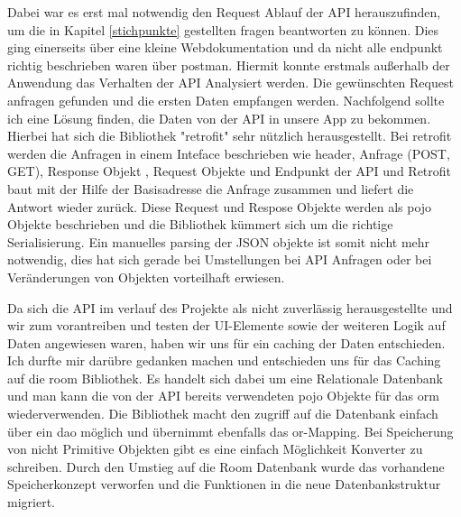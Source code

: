 Dabei war es erst mal notwendig den Request Ablauf der API herauszufinden, um die in Kapitel \ref{stichpunkte} gestellten fragen beantworten zu können. Dies ging einerseits über eine kleine Webdokumentation und da nicht alle endpunkt richtig beschrieben waren über \gls{postman}. Hiermit konnte erstmals außerhalb der Anwendung das Verhalten der API Analysiert werden. Die gewünschten Request anfragen gefunden und die ersten Daten empfangen werden. Nachfolgend sollte ich eine Lösung finden, die Daten von der API in unsere App zu bekommen. Hierbei hat sich die Bibliothek "\gls{retrofit}" sehr nützlich herausgestellt. Bei \gls{retrofit} werden die Anfragen in einem Inteface beschrieben wie header, Anfrage (POST, GET), Response Objekt , Request Objekte und Endpunkt der API und Retrofit baut mit der Hilfe der Basisadresse die Anfrage zusammen und liefert die Antwort wieder zurück. Diese Request und Respose Objekte werden als \ac{pojo} Objekte beschrieben und die Bibliothek kümmert sich um die richtige Serialisierung. Ein manuelles parsing der JSON objekte ist somit nicht mehr notwendig, dies hat sich gerade bei Umstellungen bei API Anfragen oder bei Veränderungen von Objekten vorteilhaft erwiesen.

Da sich die API im verlauf des Projekte als nicht zuverlässig herausgestellte  und wir zum vorantreiben und testen der UI-Elemente sowie der weiteren Logik auf Daten angewiesen waren, haben wir uns für ein caching der Daten entschieden. Ich durfte mir darübre gedanken machen und entschieden uns für das Caching  auf die \gls{room} Bibliothek. Es handelt sich dabei um eine Relationale Datenbank und man kann die von der API bereits verwendeten \ac{pojo} Objekte für das \ac{orm} wiederverwenden. Die Bibliothek macht den zugriff auf die Datenbank einfach über ein \ac{dao}  möglich und übernimmt ebenfalls das \ac{or}-Mapping. Bei Speicherung von nicht Primitive Objekten  gibt es eine einfach Möglichkeit Konverter zu schreiben. 
Durch den Umstieg auf die Room Datenbank wurde das vorhandene Speicherkonzept verworfen und die Funktionen in die neue Datenbankstruktur migriert.

